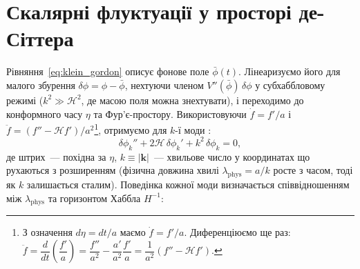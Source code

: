 \section{Скалярні флуктуації у просторі де-Сіттера}

Рівняння~\eqref{eq:klein_gordon} описує фонове поле $\bar{\phi}(t)$.
Лінеаризуємо його для малого збурення $\delta\phi = \phi - \bar{\phi}$,
нехтуючи членом $V''(\bar{\phi})\,\delta\phi$ у субхаббловому режимі
($k^2 \gg \mathcal{H}^2$, де масою поля можна знехтувати), і переходимо
до конформного часу $\eta$ та Фур'є-простору. Використовуючи
$\dot{f} = f'/a$ і $\ddot{f} = (f'' - \mathcal{H}f')/a^2$\footnote{%
З означення $d\eta = dt/a$ маємо $\dot{f} = f'/a$.
Диференціюємо ще раз:
$\ddot{f} = \dfrac{d}{dt}\!\left(\dfrac{f'}{a}\right)
= \dfrac{f''}{a^2} - \dfrac{a'}{a^2}\dfrac{f'}{a}
= \dfrac{1}{a^2}(f'' - \mathcal{H}f')$.},
отримуємо для $k$-ї моди \cite{mukhanov_2005}:
\begin{equation}\label{eq:fourier_field}
  \delta\phi_k'' + 2\mathcal{H}\,\delta\phi_k'
  + k^2\,\delta\phi_k = 0,
\end{equation}
де штрих~--- похідна за $\eta$, $k \equiv |\mathbf{k}|$~---
хвильове число у координатах що рухаються з розширенням
(фізична довжина хвилі $\lambda_\mathrm{phys} = a/k$ росте з часом,
тоді як $k$ залишається сталим). Поведінка кожної моди визначається
співвідношенням між $\lambda_\mathrm{phys}$ та горизонтом Хаббла $H^{-1}$:


